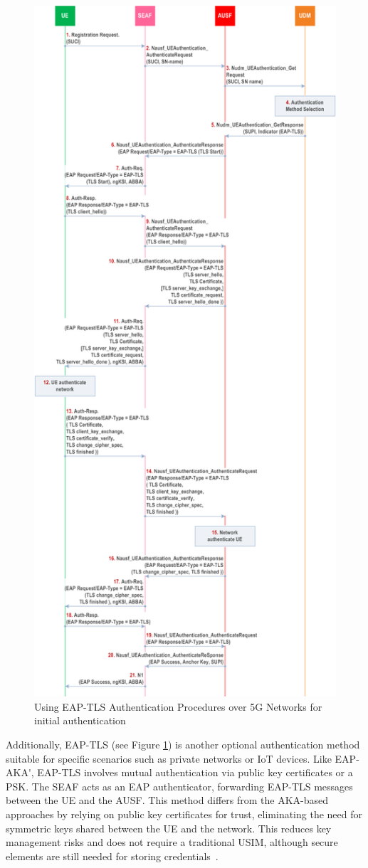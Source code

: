 \begin{figure}
    \centering
    \includegraphics[width=0.5\linewidth]{figs/Using EAP-TLS Authentication Procedures over 5G Networks for initial authentication.png}
    \caption{Using \ac{EAP-TLS} Authentication Procedures over \ac{5G} Networks for initial authentication}
    \label{fig:Using EAP-TLS Authentication Procedures over 5G Networks for initial authentication}
\end{figure}

Additionally, \ac{EAP-TLS} (see Figure \ref{fig:Using EAP-TLS Authentication Procedures over 5G Networks for initial authentication}) is another optional authentication method suitable for specific scenarios such as private networks or \ac{IoT} devices. Like \ac{EAP-AKA'}, \ac{EAP-TLS} involves mutual authentication via public key certificates or a \ac{PSK}. The \ac{SEAF} acts as an \ac{EAP} authenticator, forwarding \ac{EAP-TLS} messages between the \ac{UE} and the \ac{AUSF}. This method differs from the \ac{AKA}-based approaches by relying on public key certificates for trust, eliminating the need for symmetric keys shared between the \ac{UE} and the network. This reduces key management risks and does not require a traditional \ac{USIM}, although secure elements are still needed for storing credentials~\cite{33.501-p232}.

